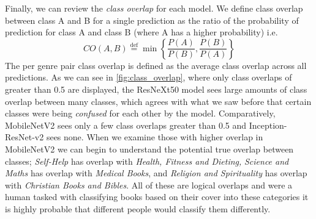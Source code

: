 \documentclass[12pt]{article}
\numberwithin{equation}{section}
\numberwithin{figure}{section}
\begin{document}
Finally, we can review the \emph{class overlap} for each model. We define class overlap between class A and B for a single prediction as the ratio of the probability of prediction for class A and class B (where A has a higher probability) i.e.
\begin{equation}
	CO(A, B) \stackrel{\mathrm{def}}{=} \min\left\{\frac{P(A)}{P(B)}, \frac{P(B)}{P(A)}\right\}
\end{equation}
The per genre pair class overlap is defined as the average class overlap across all predictions. As we can see in \cref{fig:class_overlap}, where only class overlaps of greater than 0.5 are displayed, the ResNeXt50 model sees large amounts of class overlap between many classes, which agrees with what we saw before that certain classes were being \emph{confused} for each other by the model. Comparatively, MobileNetV2 sees only a few class overlaps greater than 0.5 and Inception-ResNet-v2 sees none. When we examine those with higher overlap in MobileNetV2 we can begin to understand the potential true overlap between classes; \emph{Self-Help} has overlap with \emph{Health, Fitness and Dieting,} \emph{Science and Maths} has overlap with \emph{Medical Books}, and \emph{Religion and Spirituality} has overlap with \emph{Christian Books and Bibles}. All of these are logical overlaps and were a human tasked with classifying books based on their cover into these categories it is highly probable that different people would classify them differently. 
\end{document}
